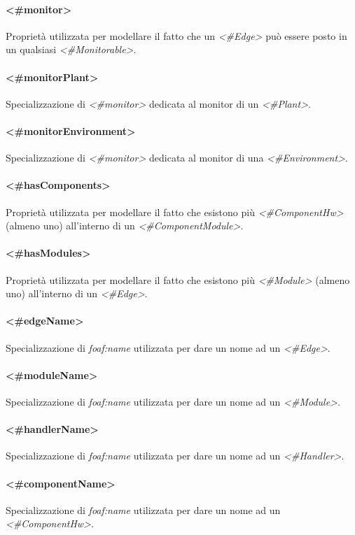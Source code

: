\paragraph{<\#monitor>}
Proprietà utilizzata per modellare il fatto che un \textit{<\#Edge>} può essere posto in un qualsiasi \textit{<\#Monitorable>}.
\paragraph{<\#monitorPlant>}
Specializzazione di \textit{<\#monitor>} dedicata al monitor di un \textit{<\#Plant>}.
\paragraph{<\#monitorEnvironment>}
Specializzazione di \textit{<\#monitor>} dedicata al monitor di una \textit{<\#Environment>}.
\paragraph{<\#hasComponents>}
Proprietà utilizzata per modellare il fatto che esistono più \textit{<\#ComponentHw>} (almeno uno) all'interno di un \textit{<\#ComponentModule>}.
\paragraph{<\#hasModules>}
Proprietà utilizzata per modellare il fatto che esistono più \textit{<\#Module>} (almeno uno) all'interno di un \textit{<\#Edge>}.
\paragraph{<\#edgeName>}
Specializzazione di \textit{foaf:name} utilizzata per dare un nome ad un \textit{<\#Edge>}.
\paragraph{<\#moduleName>}
Specializzazione di \textit{foaf:name} utilizzata per dare un nome ad un \textit{<\#Module>}.
\paragraph{<\#handlerName>}
Specializzazione di \textit{foaf:name} utilizzata per dare un nome ad un \textit{<\#Handler>}.
\paragraph{<\#componentName>}
Specializzazione di \textit{foaf:name} utilizzata per dare un nome ad un \textit{<\#ComponentHw>}.
